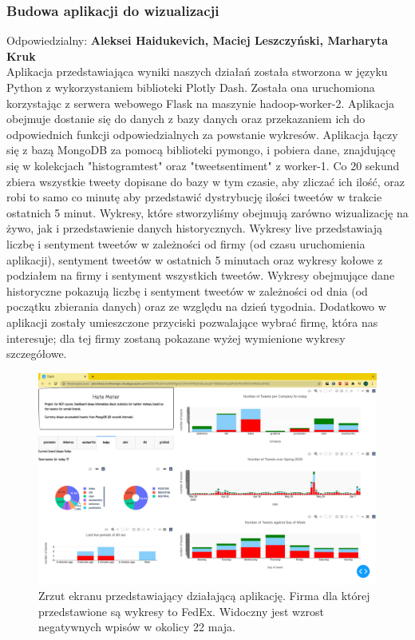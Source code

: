 \documentclass[a4paper,11pt, notitlepage ]{article}
\begin{document}
    \subsubsection{Budowa aplikacji do wizualizacji}
    Odpowiedzialny: \textbf{Aleksei Haidukevich, Maciej Leszczyński, Marharyta Kruk}\\

    
    Aplikacja przedstawiająca wyniki naszych działań została stworzona w języku Python z wykorzystaniem biblioteki Plotly Dash. Została ona uruchomiona korzystając z serwera webowego Flask na maszynie hadoop-worker-2. Aplikacja obejmuje dostanie się do danych z bazy danych oraz przekazaniem ich do odpowiednich funkcji odpowiedzialnych za powstanie wykresów.
    \newline
    \newline
    Aplikacja łączy się z bazą MongoDB za pomocą biblioteki pymongo, i pobiera dane, znajdującę się w kolekcjach "histogramtest" oraz "tweetsentiment" z worker-1. Co 20 sekund zbiera wszystkie tweety dopisane do bazy w tym czasie, aby zliczać ich ilość, oraz robi to samo co minutę aby przedstawić dystrybucję ilości tweetów w trakcie ostatnich 5 minut.
    \newline
    \newline
    Wykresy, które stworzyliśmy obejmują zarówno wizualizację na żywo, jak i przedstawienie danych historycznych. Wykresy live przedstawiają liczbę i sentyment tweetów w zależności od firmy (od czasu uruchomienia aplikacji), sentyment tweetów w ostatnich 5 minutach oraz wykresy kołowe z podziałem na firmy i sentyment wszystkich tweetów. Wykresy obejmujące dane historyczne pokazują liczbę i sentyment tweetów w zależności od dnia (od początku zbierania danych) oraz ze względu na dzień tygodnia. Dodatkowo w aplikacji zostały umieszczone przyciski pozwalające wybrać firmę, która nas interesuje; dla tej firmy zostaną pokazane wyżej wymienione wykresy szczegółowe.

    \begin{figure}[h]
        \centering
        \includegraphics[width=1 \textwidth]{fedex.png}
        \caption{Zrzut ekranu przedstawiający działającą aplikację. Firma dla której przedstawione są wykresy to FedEx. Widoczny jest wzrost negatywnych wpisów w okolicy 22 maja.}
        \label{fig:fedex}
    \end{figure}
\end{document}

